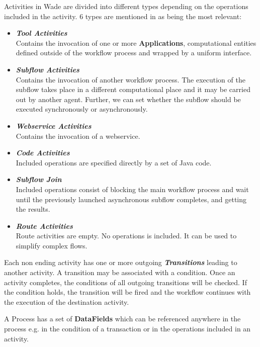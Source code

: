 Activities in Wade are divided into different types depending on the operations included in the activity. 6 types are mentioned in \cite{GCWADEUG10} as being the most relevant:
\begin{itemize}
	\item \textbf{\textit{Tool Activities}}\\
	      Contains the invocation of one or more \textbf{Applications}, computational entities defined outside of the workflow process and wrapped by a uniform interface.
	\item \textbf{\textit{Subflow Activities}}\\
	      Contains the invocation of another workflow process. The execution of the subflow takes place in a different computational place and it may be carried out by another agent. Further, we can set whether the subflow should be executed synchronously or asynchronously.
	\item \textbf{\textit{Webservice Activities}}\\
				Contains the invocation of a webservice.
	\item \textbf{\textit{Code Activities}}\\
				Included operations are specified directly by a set of Java code. 
	\item \textbf{\textit{Subflow Join}} \\
	      Included operations consist of blocking the main workflow process and wait until the previously launched asynchronous subflow completes, and getting the results.
	\item \textbf{\textit{Route Activities}}\\
				Route activities are empty. No operations is included. It can be used to simplify complex flows. 
\end{itemize}
Each non ending activity has one or more outgoing \textbf{\textit{Transitions}} leading to another activity. A transition may be associated with a condition. Once an activity completes, the conditions of all outgoing transitions will be checked. If the condition holds, the transition will be fired and the workflow continues with the execution of the destination activity.

A Process has a set of \textbf{DataFields} which can be referenced anywhere in the process e.g. in the condition of a transaction or in the operations included in an activity. 
\\\\

